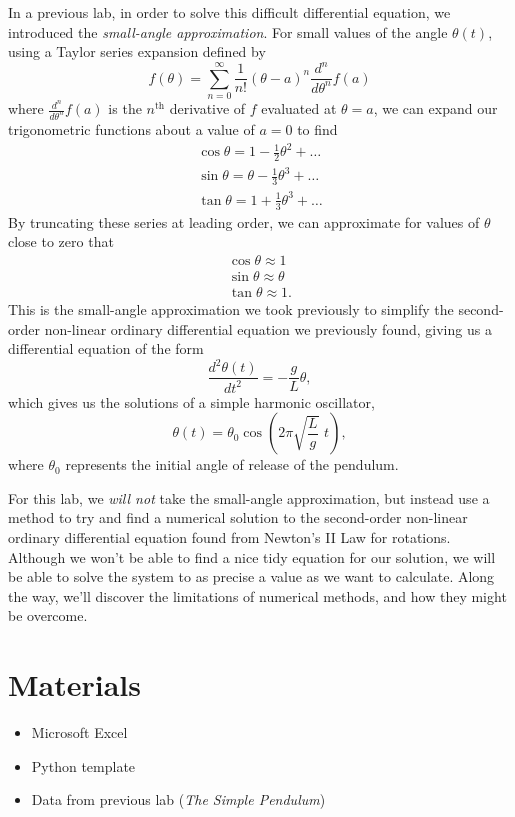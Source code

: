\documentclass{article}
\begin{document}
In a previous lab, in order to solve this difficult differential equation, we introduced the \textit{small-angle approximation}. For small values of the angle $\theta(t)$, using a Taylor series expansion defined by
\begin{equation}
    f(\theta) = \sum_{n=0}^{\infty} \frac{1}{n!}\left(\theta-a\right)^n\frac{d^n}{d\theta^n}f(a)
\end{equation}
where $\frac{d^n}{d\theta^n}f(a)$ is the $n^\mathrm{th}$ derivative of $f$ evaluated at $\theta= a $, we can expand our trigonometric functions about a value of $a = 0$ to find
\begin{gather}
    \cos\theta = 1 - \frac{1}{2}\theta^2+\ldots\\
    \sin\theta = \theta - \frac{1}{3} \theta^3 + \ldots\\
    \tan\theta = 1 + \frac{1}{3} \theta^3 + \ldots
\end{gather}
By truncating these series at leading order, we can approximate for values of $\theta$ close to zero that
\begin{gather}
    \cos\theta \approx 1 \\
    \sin\theta \approx \theta \\
    \tan\theta \approx 1 .
\end{gather}
This is the small-angle approximation we took previously to simplify the second-order non-linear ordinary differential equation we previously found, giving us a differential equation of the form
\begin{equation}
    \frac{d^2\theta(t)}{dt^2} = -\frac{g}{L} \theta,
\end{equation}
which gives us the solutions of a simple harmonic oscillator,
\begin{equation}
    \theta(t) = \theta_0 \cos\left(2\pi\sqrt{\frac{L}{g} }\,\,t\right),
\end{equation}
where $\theta_0$ represents the initial angle of release of the pendulum. 

For this lab, we \textit{will not} take the small-angle approximation, but instead use a method to try and find a numerical solution to the second-order non-linear ordinary differential equation found from Newton's II Law for rotations. Although we won't be able to find a nice tidy equation for our solution, we will be able to solve the system to as precise a value as we want to calculate. Along the way, we'll discover the limitations of numerical methods, and how they might be overcome. 
\section{Materials}
\begin{itemize}
    \item Microsoft Excel
    \item Python template
    \item Data from previous lab (\textit{The Simple Pendulum})
\end{itemize}
\end{document}
